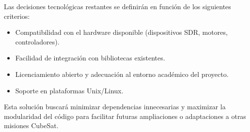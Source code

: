 Las decisiones tecnológicas restantes se definirán en función de los siguientes criterios:

\begin{itemize}
    \item Compatibilidad con el hardware disponible (dispositivos SDR, motores, controladores).
    \item Facilidad de integración con bibliotecas existentes.
    \item Licenciamiento abierto y adecuación al entorno académico del proyecto.
    \item Soporte en plataformas Unix/Linux.
\end{itemize}

Esta solución buscará minimizar dependencias innecesarias y maximizar la modularidad del código para facilitar futuras ampliaciones o adaptaciones a otras misiones CubeSat.
